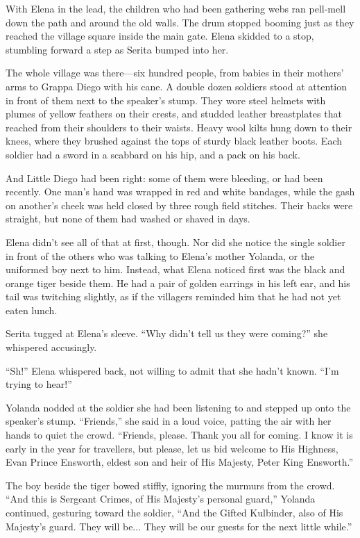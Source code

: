 \documentclass[10pt]{book}
\begin{document}
With Elena in the lead, the children who had been gathering webs ran pell-mell down the path and around the old walls. The drum stopped booming just as they reached the village square inside the main gate. Elena skidded to a stop, stumbling forward a step as Serita bumped into her.

The whole village was there---six hundred people, from babies in their mothers' arms to Grappa Diego with his cane. A double dozen soldiers stood at attention in front of them next to the speaker's stump. They wore steel helmets with plumes of yellow feathers on their crests, and studded leather breastplates that reached from their shoulders to their waists. Heavy wool kilts hung down to their knees, where they brushed against the tops of sturdy black leather boots. Each soldier had a sword in a scabbard on his hip, and a pack on his back.

And Little Diego had been right: some of them were bleeding, or had been recently. One man's hand was wrapped in red and white bandages, while the gash on another's cheek was held closed by three rough field stitches. Their backs were straight, but none of them had washed or shaved in days.

Elena didn't see all of that at first, though. Nor did she notice the single soldier in front of the others who was talking to Elena's mother Yolanda, or the uniformed boy next to him. Instead, what Elena noticed first was the black and orange tiger beside them. He had a pair of golden earrings in his left ear, and his tail was twitching slightly, as if the villagers reminded him that he had not yet eaten lunch.

Serita tugged at Elena's sleeve. ``Why didn't tell us they were coming?'' she whispered accusingly.

``Sh!'' Elena whispered back, not willing to admit that she hadn't known. ``I'm trying to hear!''

Yolanda nodded at the soldier she had been listening to and stepped up onto the speaker's stump. ``Friends,'' she said in a loud voice, patting the air with her hands to quiet the crowd. ``Friends, please. Thank you all for coming. I know it is early in the year for travellers, but please, let us bid welcome to His Highness, Evan Prince Ensworth, eldest son and heir of His Majesty, Peter King Ensworth.''

The boy beside the tiger bowed stiffly, ignoring the murmurs from the crowd. ``And this is Sergeant Crimes, of His Majesty's personal guard,'' Yolanda continued, gesturing toward the soldier, ``And the Gifted Kulbinder, also of His Majesty's guard. They will be... They will be our guests for the next little while.''
\end{document}
